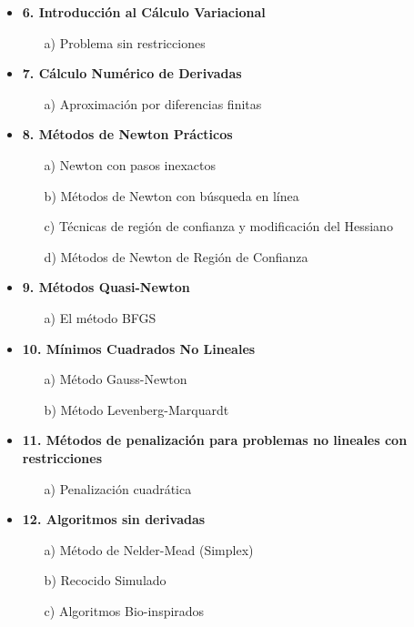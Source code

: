 \documentclass[10pt,a4paper]{article}
\begin{document}
\begin{itemize}
    \item \textbf{6. Introducción al Cálculo Variacional}
    \begin{itemize}
        \item[a)] Problema sin restricciones
    \end{itemize}

    \item \textbf{7. Cálculo Numérico de Derivadas}
    \begin{itemize}
        \item[a)] Aproximación por diferencias finitas
    \end{itemize}

    \item \textbf{8. Métodos de Newton Prácticos}
    \begin{itemize}
        \item[a)] Newton con pasos inexactos
        \item[b)] Métodos de Newton con búsqueda en línea
        \item[c)] Técnicas de región de confianza y modificación del Hessiano
        \item[d)] Métodos de Newton de Región de Confianza
    \end{itemize}

    \item \textbf{9. Métodos Quasi-Newton}
    \begin{itemize}
        \item[a)] El método BFGS
    \end{itemize}

    \item \textbf{10. Mínimos Cuadrados No Lineales}
    \begin{itemize}
        \item[a)] Método Gauss-Newton
        \item[b)] Método Levenberg-Marquardt
    \end{itemize}

    \item \textbf{11. Métodos de penalización para problemas no lineales con restricciones}
    \begin{itemize}
        \item[a)] Penalización cuadrática
    \end{itemize}

    \item \textbf{12. Algoritmos sin derivadas}
    \begin{itemize}
        \item[a)] Método de Nelder-Mead (Simplex)
        \item[b)] Recocido Simulado
        \item[c)] Algoritmos Bio-inspirados
    \end{itemize}
\end{itemize}
\newpage
\end{document}
